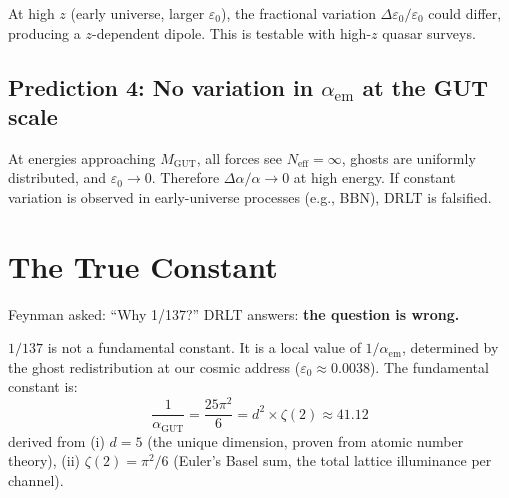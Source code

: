 \documentclass[12pt]{article}
\theoremstyle{remark}
\begin{document}
At high $z$ (early universe, larger $\varepsilon_0$), the fractional variation $\Delta\varepsilon_0/\varepsilon_0$ could differ, producing a $z$-dependent dipole. This is testable with high-$z$ quasar surveys.

\subsection{Prediction 4: No variation in $\alpha_\text{em}$ at the GUT scale}

At energies approaching $M_\text{GUT}$, all forces see $N_\text{eff} = \infty$, ghosts are uniformly distributed, and $\varepsilon_0 \to 0$. Therefore $\Delta\alpha/\alpha \to 0$ at high energy. If constant variation is observed in early-universe processes (e.g., BBN), DRLT is falsified.

\section{The True Constant}

Feynman asked: ``Why 1/137?'' DRLT answers: \textbf{the question is wrong.}

$1/137$ is not a fundamental constant. It is a local value of $1/\alpha_\text{em}$, determined by the ghost redistribution at our cosmic address ($\varepsilon_0 \approx 0.0038$). The fundamental constant is:
\begin{equation}
\boxed{\frac{1}{\alpha_\text{GUT}} = \frac{25\pi^2}{6} = d^2 \times \zeta(2) \approx 41.12}
\end{equation}
derived from (i) $d = 5$ (the unique dimension, proven from atomic number theory), (ii) $\zeta(2) = \pi^2/6$ (Euler's Basel sum, the total lattice illuminance per channel).
\end{document}

